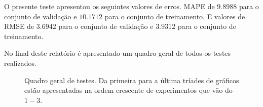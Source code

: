 \documentclass[journal, a4paper]{IEEEtran}
\begin{document}
O presente teste apresentou os seguintes valores de erros. MAPE de $9.8988$ para o conjunto de validação e $10.1712$ para o conjunto de treinamento. E valores de RMSE de $3.6942$ para o conjunto de validação e $3.9312$ para o conjunto de treinamento.

No final deste relatório é apresentado um quadro geral de todos os testes realizados.

\begin{figure}[ht!]
	\centering
	\quad %
	\quad %
    \caption{Quadro geral de testes. Da primeira para a última tríades de gráficos estão apresentadas na ordem crescente de experimentos que vão do $1-3$. }
\end{figure}
\end{document}
